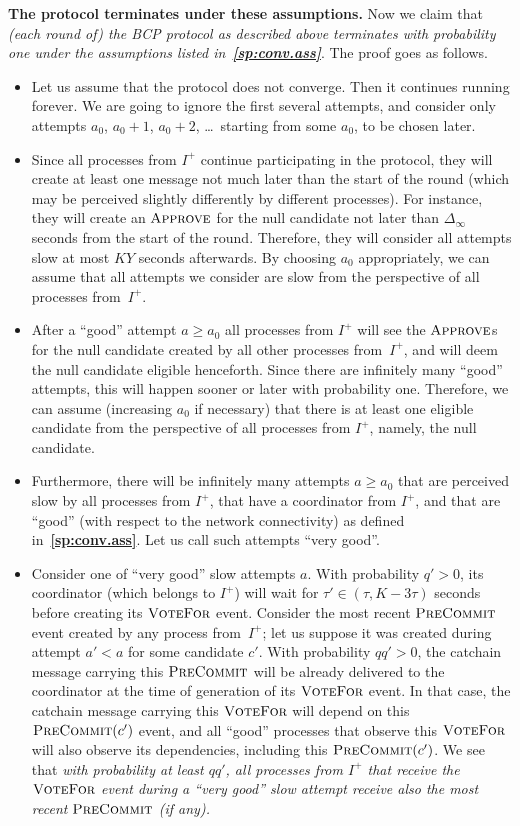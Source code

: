 \documentclass[12pt,oneside]{article}
\def\makepoint#1{\medbreak\noindent{\bf #1.\ }}
\def\nxsubpoint{\refstepcounter{subsubsection}%
  \smallbreak\makepoint{\thesubsubsection}}
\def\refpoint#1{{\rm\textbf{\ref{#1}}}}
\let\ptref=\refpoint
\def\emb#1{\textbf{#1.}}
\def\opsc#1{\operatorname{\textsc{#1}}}
\def\Approve{\opsc{Approve}}
\def\PreCommit{\opsc{PreCommit}}
\def\VoteFor{\opsc{VoteFor}}
\begin{document}
\nxsubpoint\emb{The protocol terminates under these assumptions}
Now we claim that {\em (each round of) the BCP protocol as described above terminates with probability one under the assumptions listed in~\ptref{sp:conv.ass}}. The proof goes as follows.
\begin{itemize}
\item Let us assume that the protocol does not converge. Then it continues running forever. We are going to ignore the first several attempts, and consider only attempts $a_0$, $a_0+1$, $a_0+2$, \dots\ starting from some $a_0$, to be chosen later.
\item Since all processes from $I^+$ continue participating in the protocol, they will create at least one message not much later than the start of the round (which may be perceived slightly differently by different processes). For instance, they will create an $\Approve$ for the null candidate not later than $\Delta_\infty$ seconds from the start of the round. Therefore, they will consider all attempts slow at most $KY$ seconds afterwards. By choosing $a_0$ appropriately, we can assume that all attempts we consider are slow from the perspective of all processes from~$I^+$.
\item After a ``good'' attempt $a\geq a_0$ all processes from $I^+$ will see the $\Approve$s for the null candidate created by all other processes from~$I^+$, and will deem the null candidate eligible henceforth. Since there are infinitely many ``good'' attempts, this will happen sooner or later with probability one. Therefore, we can assume (increasing $a_0$ if necessary) that there is at least one eligible candidate from the perspective of all processes from $I^+$, namely, the null candidate.
\item Furthermore, there will be infinitely many attempts $a\geq a_0$ that are perceived slow by all processes from $I^+$, that have a coordinator from $I^+$, and that are ``good'' (with respect to the network connectivity) as defined in~\ptref{sp:conv.ass}. Let us call such attempts ``very good''.
\item Consider one of ``very good'' slow attempts $a$. With probability $q'>0$, its coordinator (which belongs to $I^+$) will wait for $\tau'\in(\tau,K-3\tau)$ seconds before creating its $\VoteFor$ event. Consider the most recent $\PreCommit$ event created by any process from~$I^+$; let us suppose it was created during attempt $a'<a$ for some candidate $c'$. With probability $qq'>0$, the catchain message carrying this $\PreCommit$ will be already delivered to the coordinator at the time of generation of its $\VoteFor$ event. In that case, the catchain message carrying this $\VoteFor$ will depend on this $\PreCommit(c')$ event, and all ``good'' processes that observe this $\VoteFor$ will also observe its dependencies, including this $\PreCommit(c')$. We see that {\em with probability at least $qq'$, all processes from $I^+$ that receive the $\VoteFor$ event during a ``very good'' slow attempt receive also the most recent $\PreCommit$ (if any).}

\end{itemize}
\end{document}
